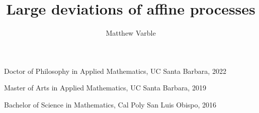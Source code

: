 \title{Large deviations of affine processes}
\author{Matthew Varble}




\maketitle

\approvalpage

\begin{vitae}
  \item
    Doctor of Philosophy in Applied Mathematics, UC Santa Barbara, 2022
  \item
    Master of Arts in Applied Mathematics, UC Santa Barbara, 2019
  \item
    Bachelor of Science in Mathematics, Cal Poly San Luis Obispo, 2016
\end{vitae}

\begin{abstract}
  \label{frontmatter:abstract}
  
\end{abstract}

\begin{acknowledgements}
  \label{frontmatter:acknowledgements}
  
\end{acknowledgements}

\tableofcontents

\begin{notation}
  \label{frontmatter:notation}
  \label{frontmatter:notation}
  
\end{notation}
